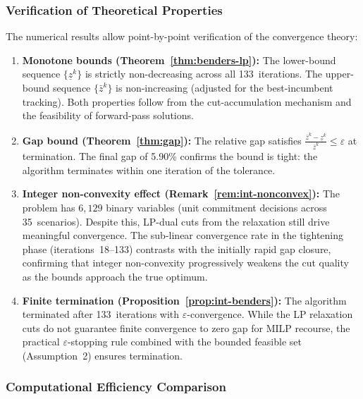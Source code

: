 \documentclass[11pt]{article}
\begin{document}
\subsubsection{Verification of Theoretical Properties}

The numerical results allow point-by-point verification of the
convergence theory:

\begin{enumerate}
  \item \textbf{Monotone bounds (Theorem~\ref{thm:benders-lp}):}
    The lower-bound sequence $\{\underline{z}^k\}$ is strictly
    non-decreasing across all 133~iterations. The upper-bound sequence
    $\{\bar{z}^k\}$ is non-increasing (adjusted for the best-incumbent
    tracking). Both properties follow from the cut-accumulation mechanism
    and the feasibility of forward-pass solutions.

  \item \textbf{Gap bound (Theorem~\ref{thm:gap}):}
    The relative gap satisfies
    $\frac{\bar{z}^k - \underline{z}^k}{\bar{z}^k} \leq \varepsilon$
    at termination. The final gap of 5.90\% confirms the bound is tight:
    the algorithm terminates within one iteration of the tolerance.

  \item \textbf{Integer non-convexity effect (Remark~\ref{rem:int-nonconvex}):}
    The problem has $6{,}129$ binary variables (unit commitment decisions
    across 35~scenarios). Despite this, LP-dual cuts from the relaxation
    still drive meaningful convergence. The sub-linear convergence rate
    in the tightening phase (iterations~18--133) contrasts with the initially
    rapid gap closure, confirming that integer non-convexity progressively
    weakens the cut quality as the bounds approach the true optimum.

  \item \textbf{Finite termination (Proposition~\ref{prop:int-benders}):}
    The algorithm terminated after 133~iterations with $\varepsilon$-convergence.
    While the LP relaxation cuts do not guarantee finite convergence to
    zero gap for MILP recourse, the practical $\varepsilon$-stopping rule
    combined with the bounded feasible set (Assumption~2) ensures
    termination.
\end{enumerate}

\subsubsection{Computational Efficiency Comparison}
\end{document}

